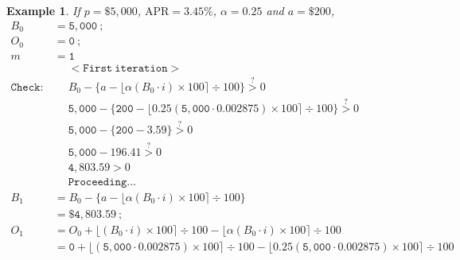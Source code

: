 \documentclass[12pt,letterpaper,oneside]{article}
\newtheorem{example}{Example}[section]
\theoremstyle{remark} %
\begin{document}
	\renewcommand{\rate}{0.002875}
	\renewcommand{\proportion}{0.25}
	\renewcommand{\amount}{200}
	\renewcommand{\balance}{5,000}
	\renewcommand{\interest}{0}
	\renewcommand{\months}{0}
	\renewcommand{\monthsp}{1}
	\renewcommand{\balanceitb}{4,803.59}
	\renewcommand{\interestitb}{10.79}
	\renewcommand{\monthsitb}{1}
	\renewcommand{\monthspitb}{2}
	\renewcommand{\balanceitc}{4,607.04}
	\renewcommand{\interestitc}{21.15}
	\renewcommand{\monthsitc}{2}
	\renewcommand{\monthspitc}{3}
	\renewcommand{\balanceitf}{47.26}
	\renewcommand{\interestitf}{141.77}
	\renewcommand{\monthsitf}{25}%
	\renewcommand{\monthspitf}{26}%
	\renewcommand{\amountfinal}{189.17}
	\begin{example}
	If $p=\$5,000$, $\mbox{APR}=3.45\%$, $\alpha=0.25$ and $a=\$200$,
	\footnotesize
	\begin{align*}
	B_{0}&=\mathtt{\balance}\ ;\\
	O_{0}&=\mathtt{\interest}\ ;\\
	m&=\mathtt{\monthsp}\\[12pt]
	&\quad\;\mathtt{<First\ iteration>}\\
	\mathtt{Check:}&\quad\;B_{\months}-\Big\{a-\big\lfloor{\alpha\left(B_{\months}\cdot i\right)\times 100}\big\rceil\div 100\Big\}\overset{?}{>}0\\[-6pt]
	&\quad\;\mathtt{\balance}-\Big\{\mathtt{\amount}-\big\lfloor{\mathtt{\proportion}\left(\mathtt{\balance}\cdot \mathtt{\rate}\right)\times 100}\big\rceil\div 100\Big\}\overset{?}{>}0\\[-6pt]
	&\quad\;\mathtt{\balance}-\Big\{\mathtt{\amount}-\mathtt{3.59}\Big\}\overset{?}{>}0\\[-6pt]
	&\quad\;\mathtt{\balance}-\mathtt{196.41}\overset{?}{>}0\\
	&\quad\;\mathtt{4,803.59}>0\\
	&\quad\;\mathtt{Proceeding...}\\[12pt]
	B_{\monthsp}&=B_{\months}-\Big\{a-\big\lfloor{\alpha\left(B_{\months}\cdot i\right)\times 100}\big\rceil\div 100\Big\}\\
	&=\mathtt{\$4,803.59}\ ;\\[12pt]
	O_{\monthsp}&=O_{\months}+\big\lfloor{\left(B_{\months}\cdot i\right)\times 100}\big\rceil\div 100-\big\lfloor{\alpha\left(B_{\months}\cdot i\right)\times 100}\big\rceil\div 100\\
	&=\mathtt{\interest}+\big\lfloor{\left(\mathtt{\balance}\cdot \mathtt{\rate}\right)\times 100}\big\rceil\div 100-\big\lfloor{\mathtt{\proportion}\left(\mathtt{\balance}\cdot \mathtt{\rate}\right)\times 100}\big\rceil\div 100\\

\end{align*}
\end{example}
\end{document}
